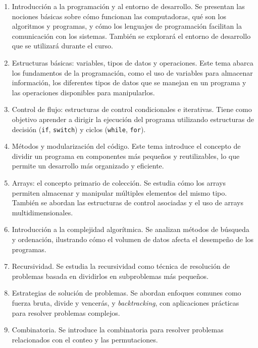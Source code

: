 \begin{enumerate}  
    \item Introducción a la programación y al entorno de desarrollo.  
    Se presentan las nociones básicas sobre cómo funcionan las computadoras, qué son los algoritmos y programas, y cómo los lenguajes de programación facilitan la comunicación con los sistemas. También se explorará el entorno de desarrollo que se utilizará durante el curso.  

    \item Estructuras básicas: variables, tipos de datos y operaciones.
    Este tema abarca los fundamentos de la programación, como el uso de variables para almacenar información, los diferentes tipos de datos que se manejan en un programa y las operaciones disponibles para manipularlos.  

    \item Control de flujo: estructuras de control condicionales e iterativas. 
    Tiene como objetivo aprender a dirigir la ejecución del programa utilizando estructuras de decisión (\texttt{if}, \texttt{switch}) y ciclos (\texttt{while}, \texttt{for}).

    \item Métodos y modularización del código.
    Este tema introduce el concepto de dividir un programa en componentes más pequeños y reutilizables, lo que permite un desarrollo más organizado y eficiente.  

    \item Arrays: el concepto primario de colección.
    Se estudia cómo los arrays permiten almacenar y manipular múltiples elementos del mismo tipo. También se abordan las estructuras de control asociadas y el uso de arrays multidimensionales.

    \item Introducción a la complejidad algorítmica.
    Se analizan métodos de búsqueda y ordenación, ilustrando cómo el volumen de datos afecta el desempeño de los programas.  

    \item Recursividad.
    Se estudia la recursividad como técnica de resolución de problemas basada en dividirlos en subproblemas más pequeños.

    \item Estrategias de solución de problemas.
    Se abordan enfoques comunes como fuerza bruta, divide y vencerás, y \textit{backtracking}, con aplicaciones prácticas para resolver problemas complejos.  

    \item Combinatoria.
    Se introduce la combinatoria para resolver problemas relacionados con el conteo y las permutaciones. 


\end{enumerate}
